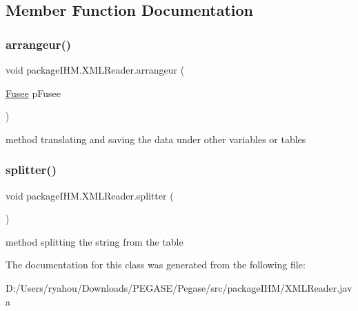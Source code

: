 \subsection{Member Function Documentation}
\mbox{\label{classpackage_i_h_m_1_1_x_m_l_reader_a2d78bb962cb1fd2e06a795d618be108c}} 
\subsubsection{\texorpdfstring{arrangeur()}{arrangeur()}}
{\footnotesize\ttfamily void package\+I\+H\+M.\+X\+M\+L\+Reader.\+arrangeur (\begin{DoxyParamCaption}\item[{\mbox{\hyperlink{classpackage_i_h_m_1_1_fusee}{Fusee}}}]{p\+Fusee }\end{DoxyParamCaption})}

method translating and saving the data under other variables or tables \mbox{\label{classpackage_i_h_m_1_1_x_m_l_reader_a08e6efd00cdf8f85131c9e7aceaebea7}} 
\subsubsection{\texorpdfstring{splitter()}{splitter()}}
{\footnotesize\ttfamily void package\+I\+H\+M.\+X\+M\+L\+Reader.\+splitter (\begin{DoxyParamCaption}{ }\end{DoxyParamCaption})}

method splitting the string from the table 

The documentation for this class was generated from the following file\+:\begin{DoxyCompactItemize}
\item 
D\+:/\+Users/ryahou/\+Downloads/\+P\+E\+G\+A\+S\+E/\+Pegase/src/package\+I\+H\+M/X\+M\+L\+Reader.\+java\end{DoxyCompactItemize}
